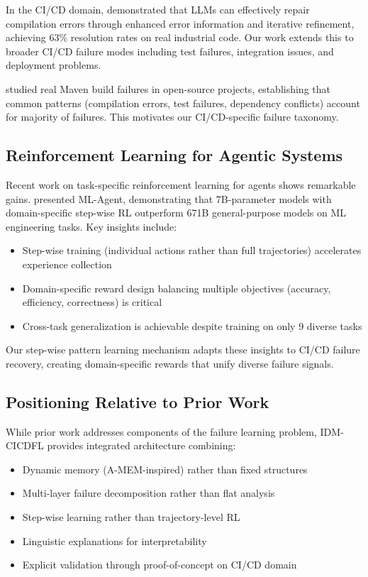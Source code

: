 \documentclass[11pt]{article}
\begin{document}
In the CI/CD domain, \citet{Fu2025} demonstrated that LLMs can effectively repair compilation errors through enhanced error information and iterative refinement, achieving 63\% resolution rates on real industrial code. Our work extends this to broader CI/CD failure modes including test failures, integration issues, and deployment problems.

\citet{Vasallo2019} studied real Maven build failures in open-source projects, establishing that common patterns (compilation errors, test failures, dependency conflicts) account for majority of failures. This motivates our CI/CD-specific failure taxonomy.

\subsection{Reinforcement Learning for Agentic Systems}

Recent work on task-specific reinforcement learning for agents shows remarkable gains. \citet{Liu2025} presented ML-Agent, demonstrating that 7B-parameter models with domain-specific step-wise RL outperform 671B general-purpose models on ML engineering tasks. Key insights include:

\begin{itemize}
    \item Step-wise training (individual actions rather than full trajectories) accelerates experience collection
    \item Domain-specific reward design balancing multiple objectives (accuracy, efficiency, correctness) is critical
    \item Cross-task generalization is achievable despite training on only 9 diverse tasks
\end{itemize}

Our step-wise pattern learning mechanism adapts these insights to CI/CD failure recovery, creating domain-specific rewards that unify diverse failure signals.

\subsection{Positioning Relative to Prior Work}

While prior work addresses components of the failure learning problem, IDM-CICDFL provides integrated architecture combining:

\begin{itemize}
    \item Dynamic memory (A-MEM-inspired) rather than fixed structures
    \item Multi-layer failure decomposition rather than flat analysis
    \item Step-wise learning rather than trajectory-level RL
    \item Linguistic explanations for interpretability
    \item Explicit validation through proof-of-concept on CI/CD domain
\end{itemize}
\end{document}
